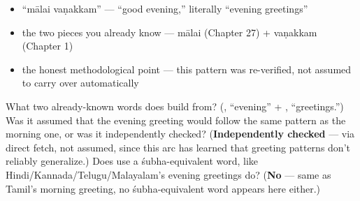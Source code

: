 \begin{itemize}
\raggedright
  \item \textquotedblleft{}mālai vaṇakkam\textquotedblright{} — \textquotedblleft{}good evening,\textquotedblright{} literally \textquotedblleft{}evening greetings\textquotedblright{}
  \item the two pieces you already know — mālai (Chapter 27) + vaṇakkam (Chapter 1)
  \item the honest methodological point — this pattern was re-verified, not assumed to carry over automatically
\end{itemize}

\begin{tcolorbox}[breakable,colback=teal!4,colframe=teal!35!black,title={Before you move on}]
What two already-known words does   build from? (, \textquotedblleft{}evening\textquotedblright{} + , \textquotedblleft{}greetings.\textquotedblright{}) Was it assumed that the evening greeting would follow the same pattern as the morning one, or was it independently checked? (\textbf{Independently checked} — via direct fetch, not assumed, since this arc has learned that greeting patterns don't reliably generalize.) Does   use a śubha-equivalent word, like Hindi/Kannada/Telugu/Malayalam's evening greetings do? (\textbf{No} — same as Tamil's morning greeting, no śubha-equivalent word appears here either.)
\end{tcolorbox}
